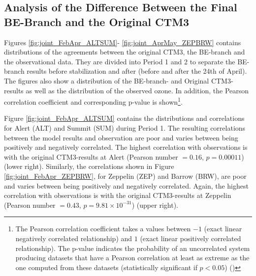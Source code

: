 





\clearpage

\subsection{Analysis of the Difference Between the Final BE-Branch and the Original CTM3}\label{sec:res_origBE} 

Figures \ref{fig:joint_FebApr_ALTSUM}- \ref{fig:joint_AprMay_ZEPBRW} contains distributions of the agreements between the original CTM3, the BE-branch and the observational data. They are divided into Period 1 and 2 to separate the BE-branch results before stabilization and after (before and after the 24th of April). The figures also show a distribution of the BE-branch- and Original CTM3-results as well as the distribution of the observed ozone. In addition, the Pearson correlation coefficient and corresponding p-value is shown\footnote{The Pearson correlation coefficient takes a values between $-1$ (exact linear negatively correlated relationship) and $1$ (exact linear positively correlated relationship). The p-value indicates the probability of an uncorrelated system producing datasets that have a Pearson correlation at least as extreme as the one computed from these datasets (statistically significant if $p<0.05$) (\cite{WILKS201123})}.

\medskip

Figure \ref{fig:joint_FebApr_ALTSUM} contains the distributions and correlations for Alert (ALT) and Summit (SUM) during Period 1. The resulting correlations between the model results and observation are poor and varies between being positively and negatively correlated. The highest correlation with observations is with the original CTM3-results at Alert (Pearson number $=0.16$, $p = 0.00011$) (lower right). Similarly, the correlations shown in Figure \ref{fig:joint_FebApr_ZEPBRW}, for Zeppelin (ZEP) and Barrow (BRW), are poor and varies between being positively and negatively correlated. Again, the highest correlation with observations is with the original CTM3-results at Zeppelin (Pearson number $=0.43$, $p = 9.81\times10^{-31}$) (upper right). 

\medskip

